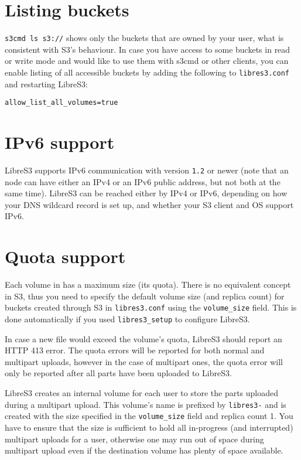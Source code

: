 \section{Listing buckets}
\label{sec:listing-buckets}

\verb|s3cmd ls s3://| shows only the buckets that are owned by your user,
what is consistent with S3's behaviour. In case you have access to some buckets
in read or write mode and would like to use them with s3cmd or other clients,
you can enable listing of all accessible buckets by adding the following to
\verb|libres3.conf| and restarting LibreS3:
\begin{lstlisting}
allow_list_all_volumes=true
\end{lstlisting}

\section{IPv6 support}

LibreS3 supports IPv6 communication with \SX version \verb|1.2| or newer
(note that an \SX node can have either an IPv4 or an IPv6 public address, but not both at the same time).
LibreS3 can be reached either by IPv4 or IPv6, depending on how your DNS
wildcard record is set up, and whether your S3 client and OS support IPv6. 

\section{Quota support}

Each volume in \SX has a maximum size (its quota).
There is no equivalent concept in S3, thus you need to specify the default
volume size (and replica count) for buckets created through S3 in \verb|libres3.conf| using the
\verb|volume_size| field. This is done automatically if you used
\verb|libres3_setup| to configure LibreS3.

In case a new file would exceed the \SX volume's quota, LibreS3 should report an
HTTP 413 error. The quota errors will be reported for both normal and multipart
uploads, however in the case of multipart ones, the quota error will only be
reported after all parts have been uploaded to LibreS3.

LibreS3 creates an internal volume for each user to store the parts uploaded
during a multipart upload. This volume's name is prefixed by \verb|libres3-|
and is created with the size specified in the
\verb|volume_size| field and replica count 1. You have to ensure that the size is sufficient to
hold all in-progress (and interrupted) multipart uploads for a user, otherwise
one may run out of space during multipart upload even if the destination volume
has plenty of space available.

